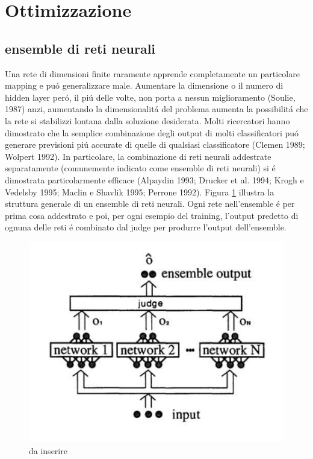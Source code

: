 \documentclass[a4paper,10pt]{article}
\begin{document}
 
 \section{Ottimizzazione}
 \subsection{ensemble di reti neurali}
 Una rete di dimensioni finite raramente apprende completamente un particolare mapping e pu\'o generalizzare male. Aumentare la dimensione o il numero di hidden layer per\'o, il pi\'u delle volte, non porta a nessun miglioramento (Soulie, 1987) anzi, aumentando la dimensionalit\'a del problema aumenta la possibilit\'a che la rete si stabilizzi lontana dalla soluzione desiderata. 
 Molti ricercatori hanno dimostrato che la semplice combinazione degli output di molti classificatori pu\'o generare previsioni pi\'u accurate di quelle di qualsiasi classificatore (Clemen 1989; Wolpert 1992). In particolare, la combinazione di reti neurali addestrate separatamente (comunemente indicato come ensemble di reti neurali) si \'e dimostrata particolarmente efficace (Alpaydin 1993; Drucker et al. 1994; Krogh e Vedelsby 1995; Maclin e Shavlik 1995; Perrone 1992). 
 Figura \ref{EnsembleStructurepng} illustra la struttura generale di un ensemble di reti neurali. Ogni rete nell'ensemble \'e per prima cosa addestrato e poi, per ogni esempio del training, l'output predetto di ognuna delle reti \'e combinato dal judge per produrre l'output dell'ensemble. 
 \begin{figure}[h!]
  \centering
  \includegraphics[scale=0.3]{EnsembleStructure.png}
  \caption{da inserire}
  \label{EnsembleStructurepng}
 \end{figure}
 
\end{document}
